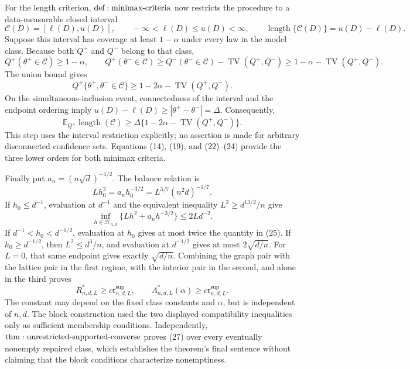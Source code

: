 For the length criterion, \({\rm def:minimax\text{-}criteria}\) now restricts the procedure to a data-measurable closed interval
\[
 \mathcal C(D)=[\ell(D),u(D)],
 \qquad -\infty<\ell(D)\leq u(D)<\infty,
 \qquad \operatorname{length}\{\mathcal C(D)\}=u(D)-\ell(D).
\]
Suppose this interval has coverage at least \(1-\alpha\) under every law in the model class.  Because both \(Q^+\) and \(Q^-\) belong to that class,
\[
 Q^+(\theta^+\in\mathcal C)\geq1-\alpha,
 \qquad
 Q^+(\theta^-\in\mathcal C)
 \geq Q^-(\theta^-\in\mathcal C)-\operatorname{TV}(Q^+,Q^-)
 \geq1-\alpha-\operatorname{TV}(Q^+,Q^-).
\]
The union bound gives
\[
 Q^+\{\theta^+,\theta^-\in\mathcal C\}
 \geq1-2\alpha-\operatorname{TV}(Q^+,Q^-).
\]
On the simultaneous-inclusion event, connectedness of the interval and the endpoint ordering imply
\(u(D)-\ell(D)\geq|\theta^+-\theta^-|=\Delta\).  Consequently,
\[
 \mathbb E_{Q^+}\operatorname{length}(\mathcal C)
 \geq\Delta\{1-2\alpha-\operatorname{TV}(Q^+,Q^-)\}.
\tag{24}
\]
This step uses the interval restriction explicitly; no assertion is made for arbitrary disconnected confidence sets.  Equations (14), (19), and (22)--(24) provide the three lower orders for both minimax criteria.

Finally put \(a_n=(n\sqrt d)^{-1/2}\).  The balance relation is
\[
 Lh_0^2=a_nh_0^{-3/2}=L^{3/7}(n^2d)^{-1/7}.
\tag{25}
\]
If \(h_0\leq d^{-1}\), evaluation at \(d^{-1}\) and the equivalent inequality \(L^2\geq d^{13/2}/n\) give
\[
 \inf_{h\in\mathcal H_{n,d}}\{Lh^2+a_nh^{-3/2}\}\leq2Ld^{-2}.
\tag{26}
\]
If \(d^{-1}<h_0<d^{-1/2}\), evaluation at \(h_0\) gives at most twice the quantity in (25).  If \(h_0\geq d^{-1/2}\), then \(L^2\leq d^3/n\), and evaluation at \(d^{-1/2}\) gives at most \(2\sqrt{d/n}\).  For \(L=0\), that same endpoint gives exactly \(\sqrt{d/n}\).  Combining the graph pair with the lattice pair in the first regime, with the interior pair in the second, and alone in the third proves
\[
 R^*_{n,d,L}\geq c\mathfrak r^{\mathrm{sup}}_{n,d,L},
 \qquad \Lambda^*_{n,d,L}(\alpha)\geq c\mathfrak r^{\mathrm{sup}}_{n,d,L}.
\tag{27}
\]
The constant may depend on the fixed class constants and \(\alpha\), but is independent of \(n,d\).  The block construction used the two displayed compatibility inequalities only as sufficient membership conditions.  Independently, \({\rm thm:unrestricted\text{-}supported\text{-}converse}\) proves (27) over every eventually nonempty repaired class, which establishes the theorem's final sentence without claiming that the block conditions characterize nonemptiness.